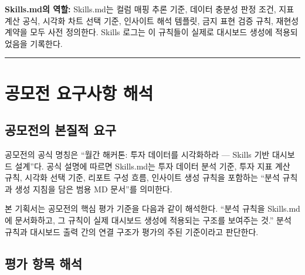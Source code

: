 \documentclass[10pt,a4paper]{article}
\begin{document}
\textbf{Skills.md의 역할:} Skills.md는 컬럼 매핑 추론 기준, 데이터 충분성 판정 조건, 지표 계산 공식, 시각화 차트 선택 기준, 인사이트 해석 템플릿, 금지 표현 검증 규칙, 재현성 계약을 모두 사전 정의한다. Skills 로그는 이 규칙들이 실제로 대시보드 생성에 적용되었음을 기록한다.

\begin{center}\rule{0.5\linewidth}{0.5pt}\end{center}

\section{공모전 요구사항 해석}\label{uxacf5uxbaa8uxc804-uxc694uxad6cuxc0acuxd56d-uxd574uxc11d}

\subsection{공모전의 본질적 요구}\label{uxacf5uxbaa8uxc804uxc758-uxbcf8uxc9c8uxc801-uxc694uxad6c}

공모전의 공식 명칭은 ``월간 해커톤: 투자 데이터를 시각화하라 --- Skills 기반 대시보드 설계''다. 공식 설명에 따르면 Skills.md는 투자 데이터 분석 기준, 투자 지표 계산 규칙, 시각화 선택 기준, 리포트 구성 흐름, 인사이트 생성 규칙을 포함하는 ``분석 규칙과 생성 지침을 담은 범용 MD 문서''를 의미한다.

본 기획서는 공모전의 핵심 평가 기준을 다음과 같이 해석한다. ``분석 규칙을 Skills.md에 문서화하고, 그 규칙이 실제 대시보드 생성에 적용되는 구조를 보여주는 것.'' 분석 규칙과 대시보드 출력 간의 연결 구조가 평가의 주된 기준이라고 판단한다.

\subsection{평가 항목 해석}\label{uxd3c9uxac00-uxd56duxbaa9-uxd574uxc11d}
\end{document}
